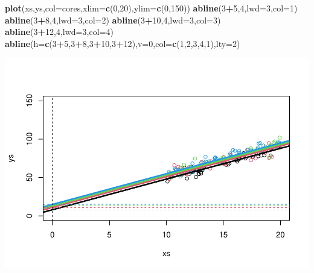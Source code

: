 \documentclass[
]{book}
\newenvironment{Shaded}{\begin{snugshade}}{\end{snugshade}}
\newcommand{\AttributeTok}[1]{\textcolor[rgb]{0.13,0.29,0.53}{#1}}
\newcommand{\DecValTok}[1]{\textcolor[rgb]{0.00,0.00,0.81}{#1}}
\newcommand{\FunctionTok}[1]{\textcolor[rgb]{0.13,0.29,0.53}{\textbf{#1}}}
\newcommand{\NormalTok}[1]{#1}
\newcommand{\SpecialCharTok}[1]{\textcolor[rgb]{0.81,0.36,0.00}{\textbf{#1}}}
\begin{document}
\begin{Shaded}
\begin{Highlighting}[]
\FunctionTok{plot}\NormalTok{(xs,ys,}\AttributeTok{col=}\NormalTok{cores,}\AttributeTok{xlim=}\FunctionTok{c}\NormalTok{(}\DecValTok{0}\NormalTok{,}\DecValTok{20}\NormalTok{),}\AttributeTok{ylim=}\FunctionTok{c}\NormalTok{(}\DecValTok{0}\NormalTok{,}\DecValTok{150}\NormalTok{))}
\FunctionTok{abline}\NormalTok{(}\DecValTok{3}\SpecialCharTok{+}\DecValTok{5}\NormalTok{,}\DecValTok{4}\NormalTok{,}\AttributeTok{lwd=}\DecValTok{3}\NormalTok{,}\AttributeTok{col=}\DecValTok{1}\NormalTok{)}
\FunctionTok{abline}\NormalTok{(}\DecValTok{3}\SpecialCharTok{+}\DecValTok{8}\NormalTok{,}\DecValTok{4}\NormalTok{,}\AttributeTok{lwd=}\DecValTok{3}\NormalTok{,}\AttributeTok{col=}\DecValTok{2}\NormalTok{)}
\FunctionTok{abline}\NormalTok{(}\DecValTok{3}\SpecialCharTok{+}\DecValTok{10}\NormalTok{,}\DecValTok{4}\NormalTok{,}\AttributeTok{lwd=}\DecValTok{3}\NormalTok{,}\AttributeTok{col=}\DecValTok{3}\NormalTok{)}
\FunctionTok{abline}\NormalTok{(}\DecValTok{3}\SpecialCharTok{+}\DecValTok{12}\NormalTok{,}\DecValTok{4}\NormalTok{,}\AttributeTok{lwd=}\DecValTok{3}\NormalTok{,}\AttributeTok{col=}\DecValTok{4}\NormalTok{)}
\FunctionTok{abline}\NormalTok{(}\AttributeTok{h=}\FunctionTok{c}\NormalTok{(}\DecValTok{3}\SpecialCharTok{+}\DecValTok{5}\NormalTok{,}\DecValTok{3}\SpecialCharTok{+}\DecValTok{8}\NormalTok{,}\DecValTok{3}\SpecialCharTok{+}\DecValTok{10}\NormalTok{,}\DecValTok{3}\SpecialCharTok{+}\DecValTok{12}\NormalTok{),}\AttributeTok{v=}\DecValTok{0}\NormalTok{,}\AttributeTok{col=}\FunctionTok{c}\NormalTok{(}\DecValTok{1}\NormalTok{,}\DecValTok{2}\NormalTok{,}\DecValTok{3}\NormalTok{,}\DecValTok{4}\NormalTok{,}\DecValTok{1}\NormalTok{),}\AttributeTok{lty=}\DecValTok{2}\NormalTok{)}
\end{Highlighting}
\end{Shaded}

\includegraphics{ECOMODbook_files/figure-latex/a9.3-1.pdf}
\end{document}
